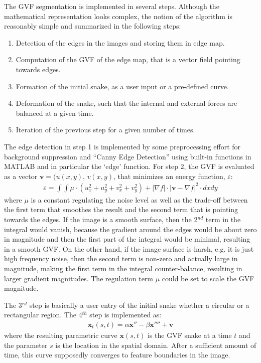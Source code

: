 \documentclass{article}
\begin{document}
The GVF segmentation is implemented in several steps. Although the mathematical representation looks complex, the notion of the algorithm is reasonably simple and summarized in the following steps:
\begin{enumerate}
\item Detection of the edges in the images and storing them in edge map.
\item Computation of the GVF of the edge map, that is a vector field pointing towards edges.
\item Formation of the initial snake, as a user input or a pre-defined curve.
\item Deformation of the snake, such that the internal and external forces are balanced at a given time.
\item Iteration of the previous step for a given number of times.
\end{enumerate}

The edge detection in step 1 is implemented by some preprocessing effort for background suppression and ``Canny Edge Detection'' using built-in functions in MATLAB and in particular the `edge' function. For step 2, the GVF is evaluated as a vector $\mathbf{v}=(u(x,y),\, v(x,y)$, that minimizes an energy function, $\varepsilon$:
\begin{align*}
\varepsilon = \int \int \mu \cdot (u_x^2 +u_y^2+v_x^2+v_y^2)+|\nabla f|\cdot |\mathbf{v}-\nabla f|^2 \cdot dxdy
\end{align*}
where $\mu$ is a constant regulating the noise level as well as the trade-off between the first term that smoothes the result and the second term that is pointing towards the edges. If the image is a smooth surface, then the 2$^{nd}$ term in the integral would vanish, because the gradient around the edges would be about zero in magnitude and then the first part of the integral would be minimal, resulting in a smooth GVF. On the other hand, if the image surface is harsh, e.g. it is just high frequency noise, then the second term is non-zero and actually large in magnitude, making the first term in the integral counter-balance, resulting in larger gradient magnitudes. The regulation term $\mu$ could be set to scale the GVF magnitude.

The 3$^{rd}$ step is basically a user entry of the initial snake whether a circular or a rectangular region. The 4$^{th}$ step is implemented as:
\begin{align*}
\mathbf{x}_t(s,t) = \alpha \mathbf{x}'' - \beta \mathbf{x}'''' + \mathbf{v}
\end{align*}
where the resulting parametric curve $\mathbf{x}(s,t)$ is the GVF snake at a time $t$ and the parameter $s$ is the location in the spatial domain. After a sufficient amount of time, this curve supposedly converges to feature boundaries in the image.
\end{document}
